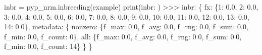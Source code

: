\documentclass[
  letterpaper,
  DIV=11,
  numbers=noendperiod]{scrreprt}
\newenvironment{Shaded}{\begin{snugshade}}{\end{snugshade}}
\newcommand{\BuiltInTok}[1]{\textcolor[rgb]{0.00,0.23,0.31}{#1}}
\newcommand{\DecValTok}[1]{\textcolor[rgb]{0.68,0.00,0.00}{#1}}
\newcommand{\FloatTok}[1]{\textcolor[rgb]{0.68,0.00,0.00}{#1}}
\newcommand{\NormalTok}[1]{\textcolor[rgb]{0.00,0.23,0.31}{#1}}
\newcommand{\OperatorTok}[1]{\textcolor[rgb]{0.37,0.37,0.37}{#1}}
\newcommand{\StringTok}[1]{\textcolor[rgb]{0.13,0.47,0.30}{#1}}
\begin{document}
\begin{Shaded}
\begin{Highlighting}[]
\NormalTok{inbr }\OperatorTok{=}\NormalTok{ pyp\_nrm.inbreeding(example)}
\BuiltInTok{print}\NormalTok{(}\StringTok{\textquotesingle{}inbr: \textquotesingle{}}\NormalTok{)}
\OperatorTok{\textgreater{}\textgreater{}\textgreater{}}\NormalTok{ inbr:  \{}
    \StringTok{\textquotesingle{}fx\textquotesingle{}}\NormalTok{: \{}\DecValTok{1}\NormalTok{: }\FloatTok{0.0}\NormalTok{, }\DecValTok{2}\NormalTok{: }\FloatTok{0.0}\NormalTok{, }\DecValTok{3}\NormalTok{: }\FloatTok{0.0}\NormalTok{, }\DecValTok{4}\NormalTok{: }\FloatTok{0.0}\NormalTok{, }\DecValTok{5}\NormalTok{: }\FloatTok{0.0}\NormalTok{, }\DecValTok{6}\NormalTok{: }\FloatTok{0.0}\NormalTok{, }\DecValTok{7}\NormalTok{: }\FloatTok{0.0}\NormalTok{,}
        \DecValTok{8}\NormalTok{: }\FloatTok{0.0}\NormalTok{, }\DecValTok{9}\NormalTok{: }\FloatTok{0.0}\NormalTok{, }\DecValTok{10}\NormalTok{: }\FloatTok{0.0}\NormalTok{, }\DecValTok{11}\NormalTok{: }\FloatTok{0.0}\NormalTok{, }\DecValTok{12}\NormalTok{: }\FloatTok{0.0}\NormalTok{, }\DecValTok{13}\NormalTok{: }\FloatTok{0.0}\NormalTok{, }\DecValTok{14}\NormalTok{: }\FloatTok{0.0}\NormalTok{\},}
    \StringTok{\textquotesingle{}metadata\textquotesingle{}}\NormalTok{: \{}
        \StringTok{\textquotesingle{}nonzero\textquotesingle{}}\NormalTok{: \{}\StringTok{\textquotesingle{}f\_max\textquotesingle{}}\NormalTok{: }\FloatTok{0.0}\NormalTok{, }\StringTok{\textquotesingle{}f\_avg\textquotesingle{}}\NormalTok{: }\FloatTok{0.0}\NormalTok{, }\StringTok{\textquotesingle{}f\_rng\textquotesingle{}}\NormalTok{: }\FloatTok{0.0}\NormalTok{,}
            \StringTok{\textquotesingle{}f\_sum\textquotesingle{}}\NormalTok{: }\FloatTok{0.0}\NormalTok{, }\StringTok{\textquotesingle{}f\_min\textquotesingle{}}\NormalTok{: }\FloatTok{0.0}\NormalTok{, }\StringTok{\textquotesingle{}f\_count\textquotesingle{}}\NormalTok{: }\DecValTok{0}\NormalTok{\},}
        \StringTok{\textquotesingle{}all\textquotesingle{}}\NormalTok{: \{}\StringTok{\textquotesingle{}f\_max\textquotesingle{}}\NormalTok{: }\FloatTok{0.0}\NormalTok{, }\StringTok{\textquotesingle{}f\_avg\textquotesingle{}}\NormalTok{: }\FloatTok{0.0}\NormalTok{, }\StringTok{\textquotesingle{}f\_rng\textquotesingle{}}\NormalTok{: }\FloatTok{0.0}\NormalTok{, }\StringTok{\textquotesingle{}f\_sum\textquotesingle{}}\NormalTok{: }\FloatTok{0.0}\NormalTok{,}
            \StringTok{\textquotesingle{}f\_min\textquotesingle{}}\NormalTok{: }\FloatTok{0.0}\NormalTok{, }\StringTok{\textquotesingle{}f\_count\textquotesingle{}}\NormalTok{: }\DecValTok{14}\NormalTok{\}}
\NormalTok{        \}}
\NormalTok{    \}}
\end{Highlighting}
\end{Shaded}
\end{document}
